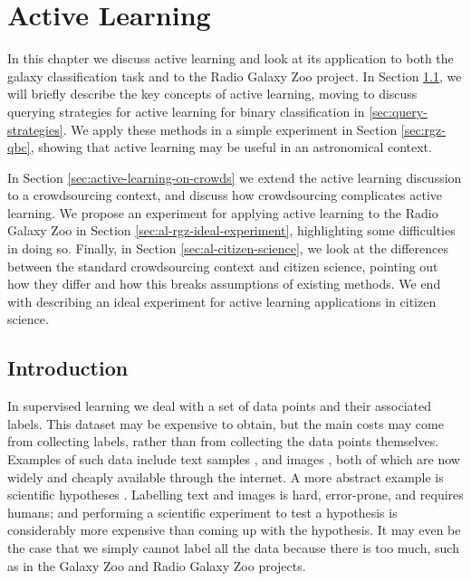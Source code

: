 
\chapter{Active Learning}
\label{cha:active-learning}

In this chapter we discuss active learning and look at its application to both
the galaxy classification task and to the Radio Galaxy Zoo project. In Section
\ref{sec:intro-active-learning}, we will briefly describe the key concepts of
active learning, moving to discuss querying strategies for active learning for
binary classification in \ref{sec:query-strategies}. We apply these methods in a
simple experiment in Section \ref{sec:rgz-qbc}, showing that active learning may
be useful in an astronomical context.

In Section \ref{sec:active-learning-on-crowds} we extend the active learning
discussion to a crowdsourcing context, and discuss how crowdsourcing complicates
active learning. We propose an experiment for applying active learning to the
Radio Galaxy Zoo in Section \ref{sec:al-rgz-ideal-experiment}, highlighting some
difficulties in doing so. Finally, in Section \ref{sec:al-citizen-science}, we
look at the differences between the standard crowdsourcing context and citizen
science, pointing out how they differ and how this breaks assumptions of
existing methods. We end with describing an ideal experiment for active learning
applications in citizen science.

\section{Introduction}
\label{sec:intro-active-learning}
    
    In supervised learning we deal with a set of data points and their
    associated labels. This dataset may be expensive to obtain, but the main
    costs may come from collecting labels, rather than from collecting the data
    points themselves. Examples of such data include text samples
    \citep{lewis94, mccallum98}, and images \citep{loy11, lintott08}, both of
    which are now widely and cheaply available through the internet. A more
    abstract example is scientific hypotheses \citep{king04}. Labelling text and
    images is hard, error-prone, and requires humans; and performing a
    scientific experiment to test a hypothesis is considerably more expensive
    than coming up with the hypothesis. It may even be the case that we simply
    cannot label all the data because there is too much, such as in the Galaxy
    Zoo \citep{lintott08} and Radio Galaxy Zoo \citep{banfield15} projects.

